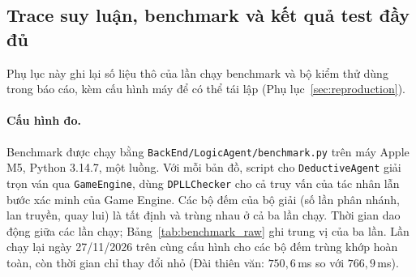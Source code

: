 \subsection{Trace suy luận, benchmark và kết quả test đầy đủ}
\label{sec:detailed_results}

Phụ lục này ghi lại số liệu thô của lần chạy benchmark và bộ kiểm thử dùng
trong báo cáo, kèm cấu hình máy để có thể tái lập
(Phụ lục~\ref{sec:reproduction}).

\begin{sloppypar}
\paragraph{Cấu hình đo.}
Benchmark được chạy bằng \nolinkurl{BackEnd/LogicAgent/benchmark.py} trên máy
Apple M5, Python 3.14.7, một luồng. Với mỗi bản đồ, script cho
\texttt{DeductiveAgent} giải trọn ván qua \texttt{GameEngine}, dùng
\texttt{DPLLChecker} cho cả truy vấn của tác nhân lẫn bước xác minh của Game
Engine. Các bộ đếm của bộ giải (số lần phân nhánh, lan truyền, quay lui) là tất
định và trùng nhau ở cả ba lần chạy. Thời gian dao động giữa các lần chạy;
Bảng~\ref{tab:benchmark_raw} ghi trung vị của ba lần. Lần chạy lại
ngày 27/11/2026 trên cùng cấu hình cho các bộ đếm trùng khớp hoàn toàn, còn thời
gian chỉ thay đổi nhỏ (Đài thiên văn: $750{,}6$\,ms so với $766{,}9$\,ms).
\end{sloppypar}

